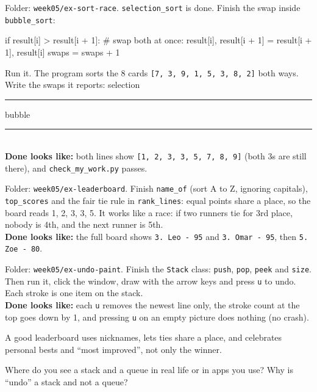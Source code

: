 \begin{exercise}
Folder: \texttt{week05/ex-sort-race}. \texttt{selection\_sort} is done. Finish the swap inside \texttt{bubble\_sort}:
\begin{pycode}
if result[i] > result[i + 1]:
    # swap both at once:
    result[i], result[i + 1] = result[i + 1], result[i]
    swaps = swaps + 1
\end{pycode}
Run it. The program sorts the 8 cards \texttt{[7, 3, 9, 1, 5, 3, 8, 2]} both ways. Write the swaps it reports: selection \rule{1.5cm}{0.4pt}\quad bubble \rule{1.5cm}{0.4pt}\\
\textbf{Done looks like:} both lines show \texttt{[1, 2, 3, 3, 5, 7, 8, 9]} (both 3s are still there), and \texttt{check\_my\_work.py} passes.
\end{exercise}

\begin{exercise}[Leaderboard]
Folder: \texttt{week05/ex-leaderboard}. Finish \texttt{name\_of} (sort A to Z, ignoring capitals), \texttt{top\_scores} and the fair tie rule in \texttt{rank\_lines}: equal points share a place, so the board reads 1, 2, 3, 3, 5. It works like a race: if two runners tie for 3rd place, nobody is 4th, and the next runner is 5th.\\
\textbf{Done looks like:} the full board shows \texttt{3. Leo - 95} and \texttt{3. Omar - 95}, then \texttt{5. Zoe - 80}.
\end{exercise}

\begin{exercise}
Folder: \texttt{week05/ex-undo-paint}. Finish the \texttt{Stack} class: \texttt{push}, \texttt{pop}, \texttt{peek} and \texttt{size}. Then run it, click the window, draw with the arrow keys and press \texttt{u} to undo. Each stroke is one item on the stack.\\
\textbf{Done looks like:} each \texttt{u} removes the newest line only, the stroke count at the top goes down by 1, and pressing \texttt{u} on an empty picture does nothing (no crash).
\end{exercise}

\begin{tip}
A good leaderboard uses nicknames, lets ties share a place, and celebrates personal bests and \enquote{most improved}, not only the winner.
\end{tip}

\begin{vocab}
\end{vocab}

\begin{reflection}
Where do you see a stack and a queue in real life or in apps you use?
Why is \enquote{undo} a stack and not a queue?
\end{reflection}
